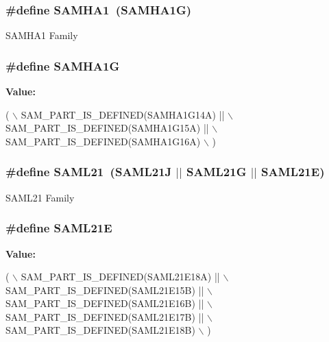 \subsubsection[{S\+A\+M\+H\+A1}]{\setlength{\rightskip}{0pt plus 5cm}\#define S\+A\+M\+H\+A1~(S\+A\+M\+H\+A1\+G)}\label{group__sam__part__macros__group_ga801950238d1ae14ecc1f1b41ebc6e392}
S\+A\+M\+H\+A1 Family \hypertarget{group__sam__part__macros__group_gaee9e99c30b50672f163da40c4cb8cb30}{}
\subsubsection[{S\+A\+M\+H\+A1\+G}]{\setlength{\rightskip}{0pt plus 5cm}\#define S\+A\+M\+H\+A1\+G}\label{group__sam__part__macros__group_gaee9e99c30b50672f163da40c4cb8cb30}
{\bfseries Value\+:}
\begin{DoxyCode}
( \(\backslash\)
        SAM\_PART\_IS\_DEFINED(SAMHA1G14A) || \(\backslash\)
        SAM\_PART\_IS\_DEFINED(SAMHA1G15A) || \(\backslash\)
        SAM\_PART\_IS\_DEFINED(SAMHA1G16A) \(\backslash\)
    )
\end{DoxyCode}
\hypertarget{group__sam__part__macros__group_ga38e970d13ac9ee9d74c527ab43bc5c36}{}
\subsubsection[{S\+A\+M\+L21}]{\setlength{\rightskip}{0pt plus 5cm}\#define S\+A\+M\+L21~(S\+A\+M\+L21\+J $\vert$$\vert$ S\+A\+M\+L21\+G $\vert$$\vert$ S\+A\+M\+L21\+E)}\label{group__sam__part__macros__group_ga38e970d13ac9ee9d74c527ab43bc5c36}
S\+A\+M\+L21 Family \hypertarget{group__sam__part__macros__group_ga77d426bf473440074718db9179864325}{}
\subsubsection[{S\+A\+M\+L21\+E}]{\setlength{\rightskip}{0pt plus 5cm}\#define S\+A\+M\+L21\+E}\label{group__sam__part__macros__group_ga77d426bf473440074718db9179864325}
{\bfseries Value\+:}
\begin{DoxyCode}
( \(\backslash\)
        SAM\_PART\_IS\_DEFINED(SAML21E18A) || \(\backslash\)
        SAM\_PART\_IS\_DEFINED(SAML21E15B) || \(\backslash\)
        SAM\_PART\_IS\_DEFINED(SAML21E16B) || \(\backslash\)
        SAM\_PART\_IS\_DEFINED(SAML21E17B) || \(\backslash\)
        SAM\_PART\_IS\_DEFINED(SAML21E18B) \(\backslash\)
    )
\end{DoxyCode}
\hypertarget{group__sam__part__macros__group_ga81494be96e002472b9a552c8cf261db0}{}
